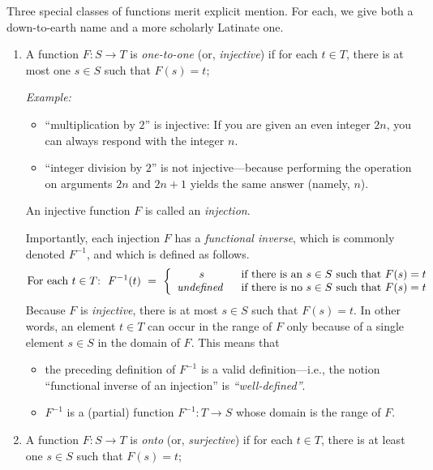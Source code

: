 Three special classes of functions merit explicit mention.  For each,
we give both a down-to-earth name and a more scholarly Latinate one.
\begin{enumerate}
\item
A function $F: S \rightarrow T$ is {\it one-to-one} (or, {\it
  injective}) if for each $t \in T$, there is at most one $s \in S$
such that $F(s) = t$;

\medskip

{\em Example:}
\begin{itemize}
\item
 ``multiplication by $2$'' is injective: If you are given an even
  integer $2n$, you can always respond with the integer $n$.
\item
``integer division by $2$'' is not injective---because performing the
  operation on arguments $2n$ and $2n+1$ yields the same answer
  (namely, $n$).
\end{itemize}

An injective function $F$ is called an {\it injection}.

\smallskip

Importantly, each injection $F$ has a {\it functional inverse},
%
which is commonly denoted $F^{-1}$,
%
and which is defined as follows.
\[
\mbox{For each $t \in T$:} \ \
F^{-1}(t) \ = \ \left\{
\begin{array}{cl}
s &
\mbox{ if there is an $s \in S$ such that $F(s) = t$} \\
\mbox{\it undefined } &
\mbox{ if there is no $s \in S$ such that $F(s) = t$}
\end{array}
\right.
\]
Because $F$ is {\em injective}, there is at most $s \in S$ such that
$F(s)= t$.  In other words, an element $t \in T$ can occur in the
range of $F$ only because of a single element $s \in S$ in the domain
of $F$.  This means that
\begin{itemize}
\item
the preceding definition of $F^{-1}$ is a valid definition---i.e., the
notion ``functional inverse of an injection'' is {\it
  ``well-defined''}.
\item
$F^{-1}$ is a (partial) function $F^{-1}: T \rightarrow S$ whose
  domain is the range of $F$.
\end{itemize}

\item
A function $F: S \rightarrow T$ is {\it onto} (or, {\it surjective}) if
for each $t \in T$, there is at least one $s \in S$ such that $F(s) =
t$;


\end{enumerate}
